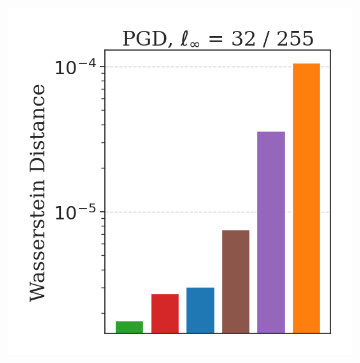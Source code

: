 \begin{figure}[H]
\begin{subfigure}[b]{0.3\textwidth}
    \end{subfigure}
    \begin{subfigure}[b]{0.3\textwidth}
        \centering
        \includegraphics[width=\textwidth]{img/results_discussion/adversarial/W_barplot_0.1255.png}
    \end{subfigure}

    \vspace{1em}


\end{figure}
